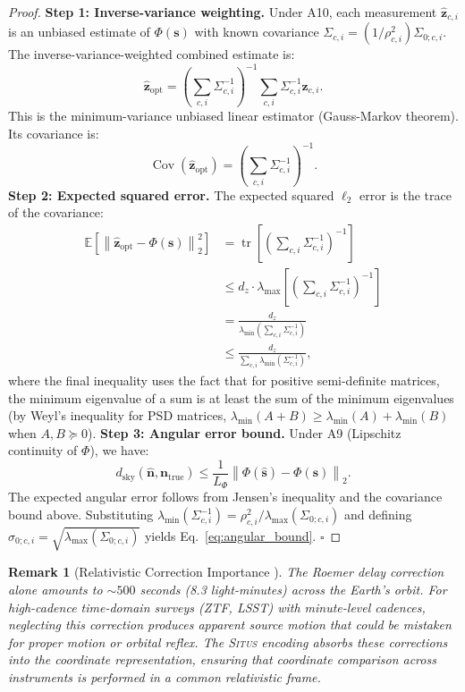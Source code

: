 \documentclass[11pt,a4paper]{article}
\newtheorem{remark}[theorem]{Remark}
\theoremstyle{definition}
\newcommand{\Situs}{\textsc{Situs}}
\DeclareMathOperator{\Cov}{Cov}
\newcommand{\E}{\mathbb{E}}
\newcommand{\norm}[1]{\left\lVert#1\right\rVert}
\begin{document}
\begin{proof}
\textbf{Step 1: Inverse-variance weighting.}
Under A10, each measurement $\hat{\mathbf{z}}_{c,i}$ is an unbiased estimate of $\Phi(\mathbf{s})$ with known covariance $\Sigma_{c,i} = (1/\rho_{c,i}^2) \Sigma_{0; c,i}$. The inverse-variance-weighted combined estimate is:
\begin{equation}
\hat{\mathbf{z}}_{\mathrm{opt}} = \left(\sum_{c,i} \Sigma_{c,i}^{-1}\right)^{-1} \sum_{c,i} \Sigma_{c,i}^{-1} \hat{\mathbf{z}}_{c,i}.
\end{equation}
This is the minimum-variance unbiased linear estimator (Gauss-Markov theorem). Its covariance is:
\begin{equation}
\Cov(\hat{\mathbf{z}}_{\mathrm{opt}}) = \left(\sum_{c,i} \Sigma_{c,i}^{-1}\right)^{-1}.
\end{equation}
\textbf{Step 2: Expected squared error.}
The expected squared $\ell_2$ error is the trace of the covariance:
\begin{align}
\E[\norm{\hat{\mathbf{z}}_{\mathrm{opt}} - \Phi(\mathbf{s})}_2^2] &= \operatorname{tr}\!\left[\left(\sum_{c,i} \Sigma_{c,i}^{-1}\right)^{-1}\right] \\
&\leq d_z \cdot \lambda_{\max}\!\left[\left(\sum_{c,i} \Sigma_{c,i}^{-1}\right)^{-1}\right] \nonumber \\
&= \frac{d_z}{\lambda_{\min}\!\left(\sum_{c,i} \Sigma_{c,i}^{-1}\right)} \nonumber \\
&\leq \frac{d_z}{\sum_{c,i} \lambda_{\min}(\Sigma_{c,i}^{-1})},
\end{align}
where the final inequality uses the fact that for positive semi-definite matrices, the minimum eigenvalue of a sum is at least the sum of the minimum eigenvalues (by Weyl's inequality for PSD matrices, $\lambda_{\min}(A+B) \geq \lambda_{\min}(A) + \lambda_{\min}(B)$ when $A, B \succeq 0$).
\textbf{Step 3: Angular error bound.}
Under A9 (Lipschitz continuity of $\Phi$), we have:
\begin{equation}
d_{\mathrm{sky}}(\hat{\mathbf{n}}, \mathbf{n}_{\mathrm{true}}) \leq \frac{1}{L_\Phi} \norm{\Phi(\hat{\mathbf{s}}) - \Phi(\mathbf{s})}_2.
\end{equation}
The expected angular error follows from Jensen's inequality and the covariance bound above. Substituting $\lambda_{\min}(\Sigma_{c,i}^{-1}) = \rho_{c,i}^2 / \lambda_{\max}(\Sigma_{0; c,i})$ and defining $\sigma_{0; c,i} = \sqrt{\lambda_{\max}(\Sigma_{0; c,i})}$ yields Eq.~\ref{eq:angular_bound}. $\square$
\end{proof}
\begin{remark}[Relativistic Correction Importance ]
The Roemer delay correction alone amounts to $\sim 500$ seconds (8.3 light-minutes) across the Earth's orbit. For high-cadence time-domain surveys (ZTF, LSST) with minute-level cadences, neglecting this correction produces apparent source motion that could be mistaken for proper motion or orbital reflex. The \Situs{} encoding absorbs these corrections into the coordinate representation, ensuring that coordinate comparison across instruments is performed in a common relativistic frame.
\end{remark}
\end{document}
